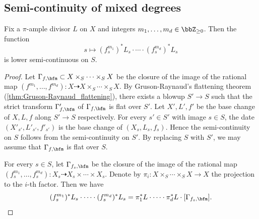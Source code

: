 \subsection{Semi-continuity of mixed degrees}

  \begin{proposition}\label{prop:semi-continuity-mixed-degrees}
    Fix a $\pi$-ample divisor $L$ on $X$ and integers $m_1, \ldots, m_d \in \bbZ_{\geq 0}$.
    Then the function 
    \[ s \mapsto (f_s^{m_1})^*L_s \cdot \cdots \cdot (f_s^{m_d})^*L_s \]
    is lower semi-continuous on $S$.
  \end{proposition}
  \begin{proof}
    Let $\Gamma_{f,\bfm} \subset X \times_S \cdots \times_S X$ be the closure of the image of the rational map $(f^{m_1}, \ldots, f^{m_d}): X \dashrightarrow X \times_S \cdots \times_S X$.
    By Gruson-Raynaud's flattening theorem (\cref{thm:Gruson-Raynaud_flattening}), there exists a blowup $S' \to S$ such that the strict transform $\Gamma'_{f,\bfm}$ of $\Gamma_{f,\bfm}$ is flat over $S'$.
    Let $X', L', f'$ be the base change of $X, L, f$ along $S' \to S$ respectively.
    For every $s' \in S'$ with image $s \in S$, the date $(X'_{s'}, L'_{s'}, f'_{s'})$ is the base change of $(X_s, L_s, f_s)$.
    Hence the semi-continuity on $S$ follows from the semi-continuity on $S'$.
    By replacing $S$ with $S'$, we may assume that $\Gamma_{f,\bfm}$ is flat over $S$.

    For every $s \in S$, let $\Gamma_{f_s,\bfm}$ be the closure of the image of the rational map $(f_s^{m_1}, \ldots, f_s^{m_d}): X_s \dashrightarrow X_s \times \cdots \times X_s$.
    Denote by $\pi_i: X \times_S \cdots \times_S X \to X$ the projection to the $i$-th factor.
    Then we have
    \[ (f_s^{m_1})^*L_s \cdot \cdots \cdot (f_s^{m_d})^*L_s = \pi_1^*L \cdot \cdots \cdot \pi_d^*L \cdot [\Gamma_{f_s,\bfm}]. \]


\end{proof}
